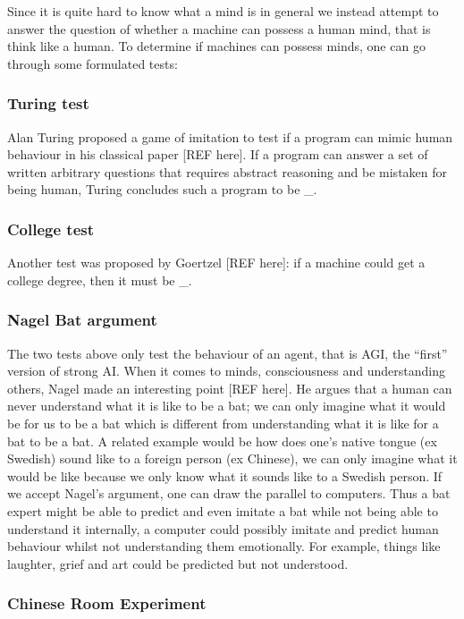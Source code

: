 \documentclass[11pt]{article}
\begin{document}
Since it is quite hard to know what a mind is in general we instead attempt to answer the question of whether a machine can possess a human mind, that is think like a human. To determine if machines can possess minds, one can go through some formulated tests:

\subsubsection{Turing test}

Alan Turing proposed a game of imitation to test if a program can mimic human behaviour in his classical paper [REF here]. If a program can answer a set of written arbitrary questions that requires abstract reasoning and be mistaken for being human, Turing concludes such a program to be \_.

\subsubsection{College test}

Another test was proposed by Goertzel [REF here]: if a machine could get a college degree, then it must be \_.

\subsubsection{Nagel Bat argument}

The two tests above only test the behaviour of an agent, that is AGI, the “first” version of strong AI. When it comes to minds, consciousness and understanding others, Nagel made an interesting point [REF here]. He argues that a human can never understand what it is like to be a bat; we can only imagine what it would be for us to be a bat which is different from understanding what it is like for a bat to be a bat. A related example would be how does one’s native tongue (ex Swedish) sound like to a foreign person (ex Chinese), we can only imagine what it would be like because we only know what it sounds like to a Swedish person. If we accept Nagel’s argument, one can draw the parallel to computers. Thus a bat expert might be able to predict and even imitate a bat while not being able to understand it internally, a computer could possibly imitate and predict human behaviour whilst not understanding them emotionally. For example, things like laughter, grief and art could be predicted but not understood.

\subsubsection{Chinese Room Experiment}
\end{document}
